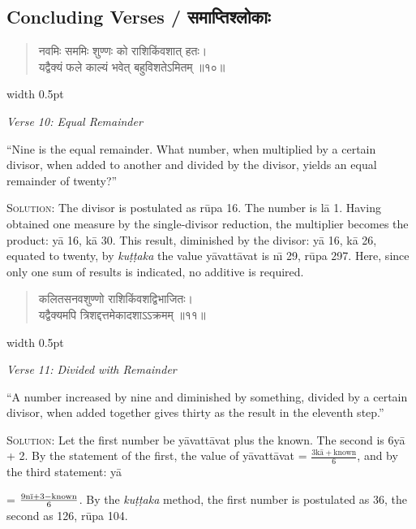 \documentclass[11pt,a4paper]{article}
\newcommand{\vs}{\vspace{0.5em}}
\newenvironment{sanskritverse}{%
  \begin{quote}\devanagarifont\textcolor{versecolor}%
}{%
  \end{quote}
}
\newcommand{\bilingual}[2]{%
  \par\vspace{0.5em}%
  \noindent\begin{minipage}[t]{0.47\textwidth}%
  \setlength{\parindent}{0pt}%
  \small #1%
  \end{minipage}%
  \hfill\textcolor{columnrule}{\vrule width 0.5pt}\hfill%
  \begin{minipage}[t]{0.47\textwidth}%
  \setlength{\parindent}{0pt}%
  \small\raggedright #2%
  \end{minipage}%
  \par\vspace{0.5em}%
}
\begin{document}
{\newpage

\subsection*{Concluding Verses / समाप्तिश्लोकाः}

\bilingual{\begin{sanskritverse}
नवमिः सममिः शुण्णः को राशिकिंवशात् हतः।\\
यद्वैक्यं फले काल्यं भवेत् बहुविशतेऽमितम् ॥१०॥
\end{sanskritverse}
}{%
\begin{flushright}
\textit{Verse 10: Equal Remainder}
\end{flushright}
``Nine is the equal remainder. What number, when multiplied by a certain divisor, when added to another and divided by the divisor, yields an equal remainder of twenty?''

\vs
\textsc{Solution:} The divisor is postulated as r\={u}pa 16. The number is l\={a} 1. Having obtained one measure by the single-divisor reduction, the multiplier becomes the product: y\={a} 16, k\={a} 30. This result, diminished by the divisor: y\={a} 16, k\={a} 26, equated to twenty, by \textit{ku\d{t}\d{t}aka} the value y\={a}vatt\={a}vat is n\={\i} 29, r\={u}pa 297. Here, since only one sum of results is indicated, no additive is required.}

\vs

\bilingual{\begin{sanskritverse}
कलितसनवशुण्णो राशिकिंवशद्विभाजितः।\\
यद्वैक्यमपि त्रिशद्दत्तमेकादशाऽऽक्रमम् ॥११॥
\end{sanskritverse}
}{%
\begin{flushright}
\textit{Verse 11: Divided with Remainder}
\end{flushright}
``A number increased by nine and diminished by something, divided by a certain divisor, when added together gives thirty as the result in the eleventh step.''

\vs
\textsc{Solution:} Let the first number be y\={a}vatt\={a}vat plus the known. The second is 6y\={a} + 2. By the statement of the first, the value of y\={a}vatt\={a}vat = $\frac{3\text{k\={a}} + \text{known}}{6}$, and by the third statement: y\={a}} = $\frac{9\text{n\={\i}} + 3 - \text{known}}{6}$. By the \textit{ku\d{t}\d{t}aka} method, the first number is postulated as 36, the second as 126, r\={u}pa 104.}
\end{document}

